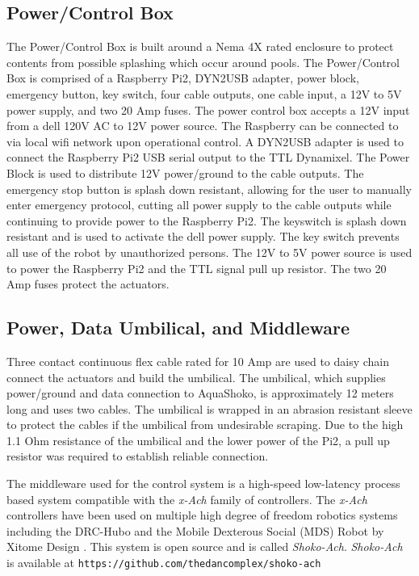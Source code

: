 \subsection{Power/Control Box}
The Power/Control Box is built around a Nema 4X rated enclosure to protect contents from possible splashing which occur around pools. The Power/Control Box is comprised of a Raspberry Pi2, DYN2USB adapter, power block, emergency button, key switch, four cable outputs, one cable input, a 12V to 5V power supply, and two 20 Amp fuses. The power control box accepts a 12V input from a dell 120V AC to 12V power source.
The Raspberry can be connected to via local wifi network upon operational control. 
A DYN2USB adapter is used to connect the Raspberry Pi2 USB serial output to the TTL Dynamixel. 
The Power Block is used to distribute 12V power/ground to the cable outputs.
The emergency stop button is splash down resistant, allowing for the user to manually enter emergency protocol, cutting all power supply to the cable outputs while continuing to provide power to the Raspberry Pi2.
The keyswitch is splash down resistant and is used to activate the dell power supply. The key switch prevents all use of the robot by unauthorized persons. The 12V to 5V power source is used to power the Raspberry Pi2 and the TTL signal pull up resistor.
The two 20 Amp fuses protect the actuators.


\subsection{Power, Data Umbilical, and Middleware}
Three contact continuous flex cable rated for 10 Amp are used to daisy chain connect the actuators and build the umbilical. %
The umbilical, which supplies power/ground and data connection to AquaShoko, is approximately 12 meters long and uses two cables. The umbilical is wrapped in an abrasion resistant sleeve to protect the cables if the umbilical from undesirable scraping. Due to the high 1.1 Ohm resistance of the umbilical and the lower power of the Pi2, a pull up resistor was required to establish reliable connection. 

The middleware used for the control system is a high-speed low-latency process based system compatible with the \textit{x-Ach} family of controllers.  The \textit{x-Ach} controllers have been used on multiple high degree of freedom robotics systems including the DRC-Hubo and the Mobile Dexterous Social (MDS) Robot by Xitome Design \cite{lofaro-2015-ieee-ram-hubo-ach,lofaro-2017-ieee-humanoids-mds-ach}.
This system is open source and is called \textit{Shoko-Ach}.
\textit{Shoko-Ach} is available at \texttt{https://github.com/thedancomplex/shoko-ach}


